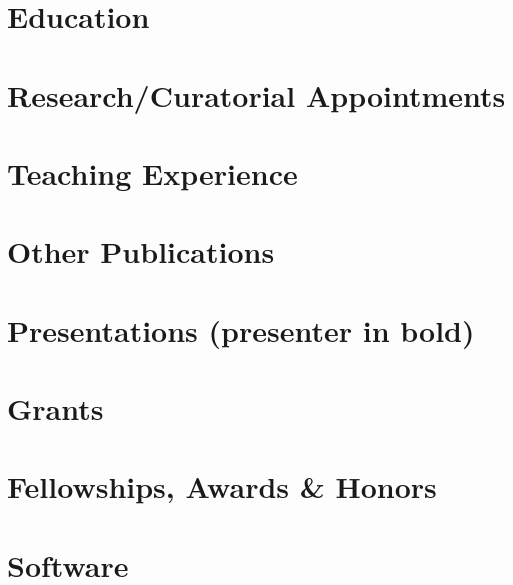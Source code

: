 

\newcommand{\docTitle}{Curriculum Vitae\xspace}


\singlespacing



\section*{Education}


\section*{Research/Curatorial Appointments}


\section*{Teaching Experience}


\nocite{*}
\printbibliography

\section*{Other Publications}


\section*{Presentations (presenter in bold)}


\section*{Grants}


\section*{Fellowships, Awards \& Honors}


\section*{Software}



